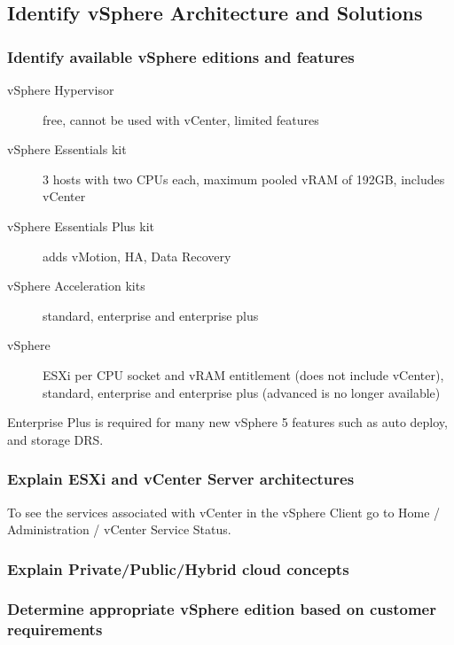 \subsection{Identify vSphere Architecture and Solutions}

\subsubsection{Identify available vSphere editions and features}

\begin{description}

\item[vSphere Hypervisor]
free, cannot be used with vCenter, limited features

\item[vSphere Essentials kit]
3 hosts with two CPUs each, maximum pooled vRAM of 192GB, includes vCenter

\item[vSphere Essentials Plus kit]
adds vMotion, HA, Data Recovery

\item[vSphere Acceleration kits]
standard, enterprise and enterprise plus

\item[vSphere]
ESXi per CPU socket and vRAM entitlement (does not include vCenter), standard,
enterprise and enterprise plus (advanced is no longer available)

\end{description}

Enterprise Plus is required for many new vSphere 5 features such as auto deploy,
and storage DRS.

\subsubsection{Explain ESXi and vCenter Server architectures}

To see the services associated with vCenter in the vSphere Client go to
Home / Administration / vCenter Service Status.

\subsubsection{Explain Private/Public/Hybrid cloud concepts}

\subsubsection{Determine appropriate vSphere edition based on customer requirements}

